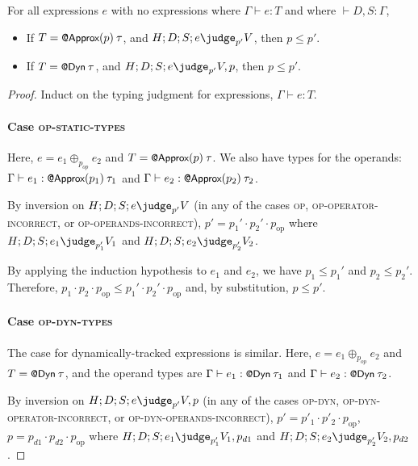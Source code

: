 {\begin{lemma}
For all expressions $e$ with no  expressions
where $\Gamma \vdash e : T$
and where $\vdash D, S : \Gamma$,
\begin{itemize}
\item
If $T = \text{\normalfont{\sffamily\small{@Approx}}}(p) \> \tau$,
and $H ; D ; S ; e \pjudge{p'} V$,
then $p \le p'$.
\item
If $T = \text{\normalfont{\sffamily\small{@Dyn}}} \> \tau$,
and $H ; D ; S ; e \pjudge{p'} V, p$,
then $p \le p'$.
\end{itemize}
\end{lemma}

\begin{proof}
Induct on the typing judgment for expressions, $\Gamma \vdash e : T$.

\paragraph{Case \textsc{op-static-types}}
Here, $e = e_1 \oplus_{p_{op}} e_2$
and $T = \text{\normalfont{\sffamily\small{@Approx}}}(p) \> \tau$.
We also have types for the operands:
$\Gamma \vdash e_1 : \text{\normalfont{\sffamily\small{@Approx}}}(p_1) \> \tau_1$
and
$\Gamma \vdash e_2 : \text{\normalfont{\sffamily\small{@Approx}}}(p_2) \> \tau_2$.

By inversion on $H ; D ; S ; e \pjudge{p'} V$
(in any of the cases \textsc{op}, \textsc{op-operator-incorrect}, or
\textsc{op-operands-incorrect}),
$p' = p_1' \cdot p_2' \cdot p_\text{op}$
where $H ; D ; S ; e_1 \pjudge{p_1'} V_1$
and $H ; D ; S ; e_2 \pjudge{p_2'} V_2$.

By applying the induction hypothesis to $e_1$ and $e_2$, we have
$p_1 \le p_1'$
and
$p_2 \le p_2'$.
Therefore,
$p_1 \cdot p_2 \cdot p_\text{op}
\le
p_1' \cdot p_2' \cdot p_\text{op}$
and, by substitution,
$p \le p'$.

\paragraph{Case \textsc{op-dyn-types}}
The case for dynamically-tracked expressions is similar.
Here, $e = e_1 \oplus_{p_{op}} e_2$ and $T = \text{\normalfont{\sffamily\small{@Dyn}}} \> \tau$,
and the operand types are
$\Gamma \vdash e_1 : \text{\normalfont{\sffamily\small{@Dyn}}} \> \tau_1$ and
$\Gamma \vdash e_2 : \text{\normalfont{\sffamily\small{@Dyn}}} \> \tau_2$.

By inversion on $H ; D ; S ; e \pjudge{p'} V, p$ (in any of the cases
\textsc{op-dyn, op-dyn-operator-incorrect}, or
\textsc{op-dyn-operands-incorrect}), $p' = p'_1 \cdot p'_2 \cdot p_\text{op}$,
$p = p_{d1} \cdot p_{d2} \cdot p_\text{op}$
where $H ; D ; S ; e_1 \pjudge{p'_1} V_1, p_{d1}$ and
$H ; D ; S ; e_2 \pjudge{p'_2} V_2, p_{d2}$.


\end{proof}}

